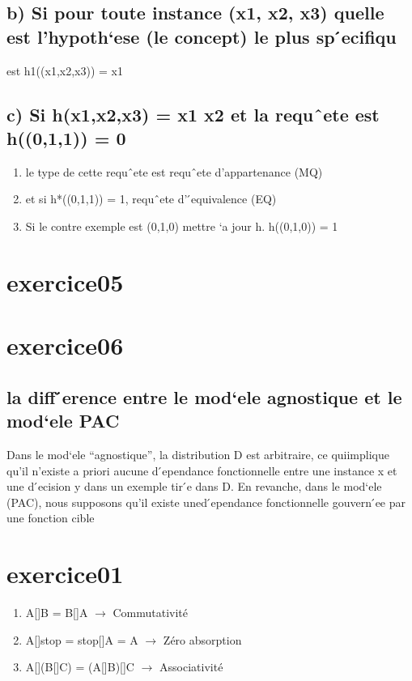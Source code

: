 \documentclass{article}
\begin{document}
    \subsection*{b) Si pour toute instance (x1, x2, x3) quelle est l’hypoth`ese
    (le concept) le plus sp ́ecifiqu} est h1((x1,x2,x3)) = x1
    \subsection*{c) Si h(x1,x2,x3) = x1 x2 et la requˆete est h((0,1,1)) =
    0}
    \begin{enumerate}
        \item le type de cette requˆete est requˆete d’appartenance (MQ)
        \item et si h*((0,1,1)) = 1, requˆete d’ ́equivalence (EQ)
        \item Si le contre exemple est (0,1,0) mettre `a jour h. h((0,1,0)) = 1

    \end{enumerate}
\section*{exercice05}
\section*{exercice06}
    \subsection*{la diff ́erence entre le mod`ele agnostique et le mod`ele
    PAC}
    Dans le mod`ele “agnostique”, la distribution D est arbitraire, ce quiimplique
    qu’il n’existe a priori aucune d ́ependance fonctionnelle entre une instance x
    et une d ́ecision y dans un exemple tir ́e dans D. En revanche, dans le mod`ele
    (PAC), nous supposons qu’il existe uned ́ependance fonctionnelle gouvern ́ee
    par une fonction cible

\section*{exercice01}
    \begin{enumerate}
    \item  A[]B = B[]A $\to$ Commutativité
        \item A[]stop = stop[]A = A $\to$ Zéro absorption
    \item  A[](B[]C) = (A[]B)[]C $\to$ Associativité 
        \end{enumerate}
\end{document}
